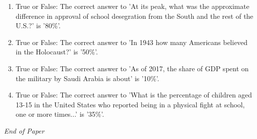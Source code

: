 \documentclass[12pt]{article}
\begin{document}
\begin{enumerate}[label=\arabic*.]
\item True or False: The correct answer to 'At its peak, what was the approximate difference in approval of school desegration from the South and the rest of the U.S.?' is '80\%'.
\item True or False: The correct answer to 'In 1943 how many Americans believed in the Holocaust?' is '50\%'.
\item True or False: The correct answer to 'As of 2017, the share of GDP spent on the military by Saudi Arabia is about' is '10\%'.
\item True or False: The correct answer to 'What is the percentage of children aged 13-15 in the United States who reported being in a physical fight at school, one or more times...' is '35\%'.
\end{enumerate}

\vfill
\noindent\textit{End of Paper}
\end{document}

